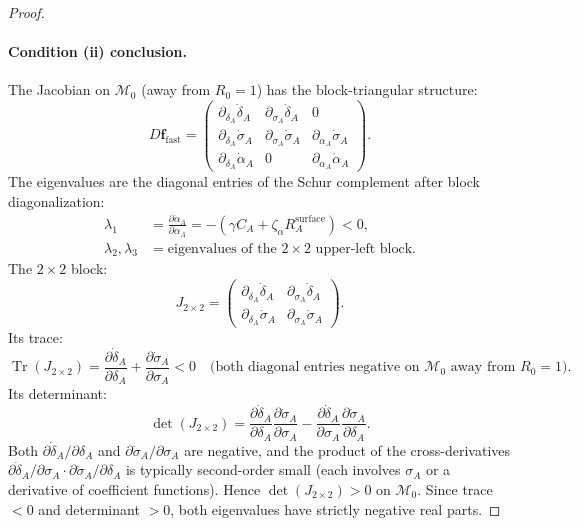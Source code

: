 \begin{proof}
\paragraph{Condition (ii) conclusion.}
The Jacobian on $\mathcal{M}_0$ (away from $R_0 = 1$) has the block-triangular
structure:
\[
D\mathbf{f}_{\text{fast}} =
\begin{pmatrix}
\partial_{\delta_A} \dot{\delta}_A & \partial_{\sigma_A} \dot{\delta}_A & 0 \\[4pt]
\partial_{\delta_A} \dot{\sigma}_A & \partial_{\sigma_A} \dot{\sigma}_A & \partial_{\alpha_A} \dot{\sigma}_A \\[4pt]
\partial_{\delta_A} \dot{\alpha}_A & 0 & \partial_{\alpha_A} \dot{\alpha}_A
\end{pmatrix}.
\]
The eigenvalues are the diagonal entries of the Schur complement after
block diagonalization:
\begin{align*}
\lambda_1 &= \frac{\partial \dot{\alpha}_A}{\partial \alpha_A} = -(\gamma C_A + \zeta_\alpha R_A^{\text{surface}}) < 0, \\
\lambda_2, \lambda_3 &= \text{eigenvalues of the } 2 \times 2 \text{ upper-left block}.
\end{align*}
The $2 \times 2$ block:
\[
J_{2 \times 2} = \begin{pmatrix}
\partial_{\delta_A} \dot{\delta}_A & \partial_{\sigma_A} \dot{\delta}_A \\
\partial_{\delta_A} \dot{\sigma}_A & \partial_{\sigma_A} \dot{\sigma}_A
\end{pmatrix}.
\]
Its trace:
\[
\operatorname{Tr}(J_{2 \times 2}) = \frac{\partial \dot{\delta}_A}{\partial \delta_A}
+ \frac{\partial \dot{\sigma}_A}{\partial \sigma_A} < 0
\quad\text{(both diagonal entries negative on $\mathcal{M}_0$ away from $R_0=1$)}.
\]
Its determinant:
\[
\det(J_{2 \times 2}) = \frac{\partial \dot{\delta}_A}{\partial \delta_A}
\frac{\partial \dot{\sigma}_A}{\partial \sigma_A}
- \frac{\partial \dot{\delta}_A}{\partial \sigma_A}
\frac{\partial \dot{\sigma}_A}{\partial \delta_A}.
\]
Both $\partial \dot{\delta}_A / \partial \delta_A$ and
$\partial \dot{\sigma}_A / \partial \sigma_A$ are negative, and the product
of the cross-derivatives $\partial \dot{\delta}_A / \partial \sigma_A
\cdot \partial \dot{\sigma}_A / \partial \delta_A$ is typically second-order
small (each involves $\sigma_A$ or a derivative of coefficient functions).
Hence $\det(J_{2 \times 2}) > 0$ on $\mathcal{M}_0$. Since trace $< 0$
and determinant $> 0$, both eigenvalues have strictly negative real parts.


\end{proof}
